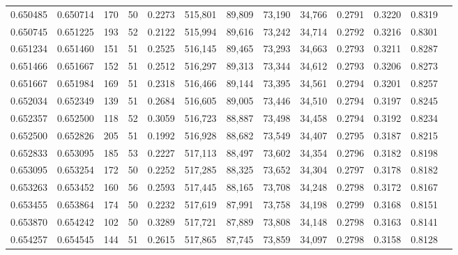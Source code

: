 \begin{tabular}{rrrrrrrrrrrrr}
0.650485 & 0.650714 &    170 &    50 &                                     0.2273 & 515,801 &  89,809 &  73,190 &  34,766 & 0.2791 & 0.3220 & 0.8319 \\
0.650745 & 0.651225 &    193 &    52 &                                     0.2122 & 515,994 &  89,616 &  73,242 &  34,714 & 0.2792 & 0.3216 & 0.8301 \\
0.651234 & 0.651460 &    151 &    51 &                                     0.2525 & 516,145 &  89,465 &  73,293 &  34,663 & 0.2793 & 0.3211 & 0.8287 \\
0.651466 & 0.651667 &    152 &    51 &                                     0.2512 & 516,297 &  89,313 &  73,344 &  34,612 & 0.2793 & 0.3206 & 0.8273 \\
0.651667 & 0.651984 &    169 &    51 &                                     0.2318 & 516,466 &  89,144 &  73,395 &  34,561 & 0.2794 & 0.3201 & 0.8257 \\
0.652034 & 0.652349 &    139 &    51 &                                     0.2684 & 516,605 &  89,005 &  73,446 &  34,510 & 0.2794 & 0.3197 & 0.8245 \\
0.652357 & 0.652500 &    118 &    52 &                                     0.3059 & 516,723 &  88,887 &  73,498 &  34,458 & 0.2794 & 0.3192 & 0.8234 \\
0.652500 & 0.652826 &    205 &    51 &                                     0.1992 & 516,928 &  88,682 &  73,549 &  34,407 & 0.2795 & 0.3187 & 0.8215 \\
0.652833 & 0.653095 &    185 &    53 &                                     0.2227 & 517,113 &  88,497 &  73,602 &  34,354 & 0.2796 & 0.3182 & 0.8198 \\
0.653095 & 0.653254 &    172 &    50 &                                     0.2252 & 517,285 &  88,325 &  73,652 &  34,304 & 0.2797 & 0.3178 & 0.8182 \\
0.653263 & 0.653452 &    160 &    56 &                                     0.2593 & 517,445 &  88,165 &  73,708 &  34,248 & 0.2798 & 0.3172 & 0.8167 \\
0.653455 & 0.653864 &    174 &    50 &                                     0.2232 & 517,619 &  87,991 &  73,758 &  34,198 & 0.2799 & 0.3168 & 0.8151 \\
0.653870 & 0.654242 &    102 &    50 &                                     0.3289 & 517,721 &  87,889 &  73,808 &  34,148 & 0.2798 & 0.3163 & 0.8141 \\
0.654257 & 0.654545 &    144 &    51 &                                     0.2615 & 517,865 &  87,745 &  73,859 &  34,097 & 0.2798 & 0.3158 & 0.8128 \\

\end{tabular}
